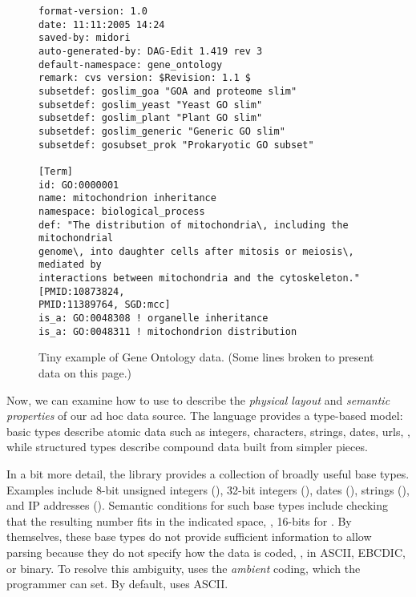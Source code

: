 \documentclass[11pt]{article}
\begin{document}
\begin{figure*}
\begin{small}
\begin{verbatim}
format-version: 1.0
date: 11:11:2005 14:24
saved-by: midori
auto-generated-by: DAG-Edit 1.419 rev 3
default-namespace: gene_ontology
remark: cvs version: $Revision: 1.1 $
subsetdef: goslim_goa "GOA and proteome slim"
subsetdef: goslim_yeast "Yeast GO slim"
subsetdef: goslim_plant "Plant GO slim"
subsetdef: goslim_generic "Generic GO slim"
subsetdef: gosubset_prok "Prokaryotic GO subset"

[Term]
id: GO:0000001
name: mitochondrion inheritance
namespace: biological_process
def: "The distribution of mitochondria\, including the mitochondrial 
genome\, into daughter cells after mitosis or meiosis\, mediated by 
interactions between mitochondria and the cytoskeleton." [PMID:10873824, 
PMID:11389764, SGD:mcc]
is_a: GO:0048308 ! organelle inheritance
is_a: GO:0048311 ! mitochondrion distribution

\end{verbatim}
\caption{Tiny example of Gene Ontology data. (Some lines broken to
present data on this page.)}
\label{figure:dibbler-records}
\end{small}
\end{figure*}

Now, we can examine how to use \pads{} to describe 
the {\em physical layout} and 
{\em semantic properties} of our ad hoc data source. 
The language provides a type-based model:
basic types describe atomic data such as integers, characters, 
strings, dates, urls, \etc, while
structured types describe compound data built from simpler pieces.
\suppressfloats

In a bit more detail,
the \pads{} library provides a collection of broadly useful base
types.  Examples include 8-bit unsigned integers (), 32-bit
integers (), dates (), strings (),
and IP addresses ().  Semantic conditions for such base types
include checking that the resulting number fits in the indicated
space, \ie, 16-bits for .  By themselves, these base types
do not provide sufficient information to allow parsing because they do
not specify how the data is coded, \ie{}, in ASCII, EBCDIC, or binary.
To resolve this ambiguity, \pads{} uses the \textit{ambient} coding,
which the programmer can set.  By default, \pads{} uses ASCII.  
\end{document}
